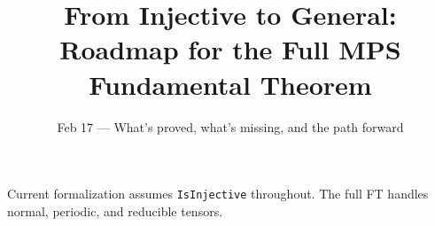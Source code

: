 \documentclass[aspectratio=169,10pt]{beamer}
\title{\textbf{From Injective to General:\\Roadmap for the Full MPS Fundamental Theorem}}
\subtitle{{\small Feb 17 --- What's proved, what's missing, and the path forward}}
\date{}
\author{}
\begin{document}
{%
\begin{frame}
    \vspace{-1.5em}
    \maketitle
    \vspace{-3.5em}
    \begin{center}
        {\footnotesize
            \textcolor{dimwhite}{Current formalization assumes
            \textcolor{amber}{\texttt{IsInjective}} throughout.
            The full FT handles
            \textcolor{leangreen}{normal},
            \textcolor{leanblue}{periodic}, and
            \textcolor{softred}{reducible} tensors.}}
    \end{center}
\end{frame}
}
\end{document}
